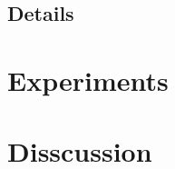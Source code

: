 \documentclass{manuscript}
\begin{document}
    \subsection{Details}

    \section{Experiments}
    \section{Disscussion}


    
\end{document}
